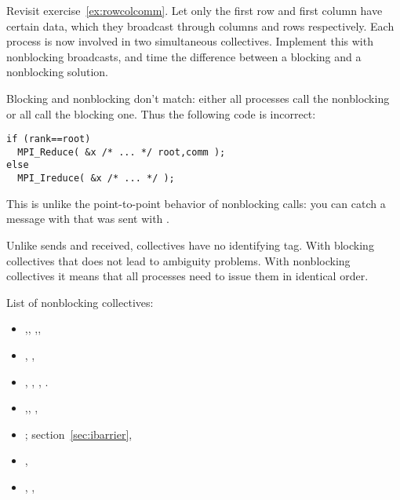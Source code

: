 \begin{exercise}
  \label{ex:procgridnonblock}
  Revisit exercise~\ref{ex:rowcolcomm}. Let only the first row and
  first column have certain data, which they broadcast through columns
  and rows respectively. Each process is now involved in two
  simultaneous collectives. Implement this with nonblocking
  broadcasts, and time the difference between a blocking and a
  nonblocking solution.
\end{exercise}

\begin{remark}
  Blocking and nonblocking don't match: either all processes
  call the nonblocking or all call the blocking one.
  Thus the following code is incorrect:
\begin{lstlisting}
if (rank==root)
  MPI_Reduce( &x /* ... */ root,comm );
else
  MPI_Ireduce( &x /* ... */ );
\end{lstlisting}
  This is unlike the point-to-point behavior of nonblocking calls:
  you can catch a message with 
  that was sent with .
\end{remark}

\begin{remark}
  Unlike sends and received, collectives have no identifying tag.
  With blocking collectives that does not lead to ambiguity problems.
  With nonblocking collectives it means that all processes
  need to issue them in identical order.
\end{remark}

List of nonblocking collectives:
\begin{itemize}
\item 
  ,,
  ,,
\item 
  , ,
\item 
  ,
  ,
  ,
  .
\item 
  ,, ,
\item 
  ; section~\ref{sec:ibarrier},
\item {},
\item {}, ,
\end{itemize}

